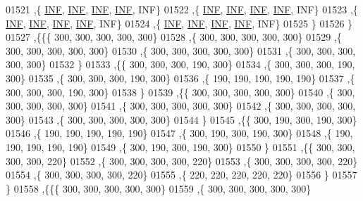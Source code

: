 \begin{DoxyCode}
01521    ,\{   \hyperlink{energy__const_8h_a12c2040f25d8e3a7b9e1c2024c618cb6}{INF},   \hyperlink{energy__const_8h_a12c2040f25d8e3a7b9e1c2024c618cb6}{INF},   \hyperlink{energy__const_8h_a12c2040f25d8e3a7b9e1c2024c618cb6}{INF},   \hyperlink{energy__const_8h_a12c2040f25d8e3a7b9e1c2024c618cb6}{INF},   INF\}
01522    ,\{   \hyperlink{energy__const_8h_a12c2040f25d8e3a7b9e1c2024c618cb6}{INF},   \hyperlink{energy__const_8h_a12c2040f25d8e3a7b9e1c2024c618cb6}{INF},   \hyperlink{energy__const_8h_a12c2040f25d8e3a7b9e1c2024c618cb6}{INF},   \hyperlink{energy__const_8h_a12c2040f25d8e3a7b9e1c2024c618cb6}{INF},   INF\}
01523    ,\{   \hyperlink{energy__const_8h_a12c2040f25d8e3a7b9e1c2024c618cb6}{INF},   \hyperlink{energy__const_8h_a12c2040f25d8e3a7b9e1c2024c618cb6}{INF},   \hyperlink{energy__const_8h_a12c2040f25d8e3a7b9e1c2024c618cb6}{INF},   \hyperlink{energy__const_8h_a12c2040f25d8e3a7b9e1c2024c618cb6}{INF},   INF\}
01524    ,\{   \hyperlink{energy__const_8h_a12c2040f25d8e3a7b9e1c2024c618cb6}{INF},   \hyperlink{energy__const_8h_a12c2040f25d8e3a7b9e1c2024c618cb6}{INF},   \hyperlink{energy__const_8h_a12c2040f25d8e3a7b9e1c2024c618cb6}{INF},   \hyperlink{energy__const_8h_a12c2040f25d8e3a7b9e1c2024c618cb6}{INF},   INF\}
01525    \}
01526   \}
01527  ,\{\{\{   300,   300,   300,   300,   300\}
01528    ,\{   300,   300,   300,   300,   300\}
01529    ,\{   300,   300,   300,   300,   300\}
01530    ,\{   300,   300,   300,   300,   300\}
01531    ,\{   300,   300,   300,   300,   300\}
01532    \}
01533   ,\{\{   300,   300,   300,   190,   300\}
01534    ,\{   300,   300,   300,   190,   300\}
01535    ,\{   300,   300,   300,   190,   300\}
01536    ,\{   190,   190,   190,   190,   190\}
01537    ,\{   300,   300,   300,   190,   300\}
01538    \}
01539   ,\{\{   300,   300,   300,   300,   300\}
01540    ,\{   300,   300,   300,   300,   300\}
01541    ,\{   300,   300,   300,   300,   300\}
01542    ,\{   300,   300,   300,   300,   300\}
01543    ,\{   300,   300,   300,   300,   300\}
01544    \}
01545   ,\{\{   300,   190,   300,   190,   300\}
01546    ,\{   190,   190,   190,   190,   190\}
01547    ,\{   300,   190,   300,   190,   300\}
01548    ,\{   190,   190,   190,   190,   190\}
01549    ,\{   300,   190,   300,   190,   300\}
01550    \}
01551   ,\{\{   300,   300,   300,   300,   220\}
01552    ,\{   300,   300,   300,   300,   220\}
01553    ,\{   300,   300,   300,   300,   220\}
01554    ,\{   300,   300,   300,   300,   220\}
01555    ,\{   220,   220,   220,   220,   220\}
01556    \}
01557   \}
01558  ,\{\{\{   300,   300,   300,   300,   300\}
01559    ,\{   300,   300,   300,   300,   300\}

\end{DoxyCode}
